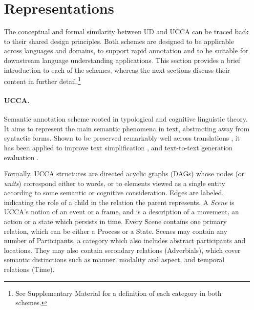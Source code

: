 \documentclass[11pt,a4paper]{article}
\begin{document}

\section{Representations}\label{sec:representations}

  The conceptual and formal similarity between UD and UCCA can be traced back
  to their shared design principles.
  Both schemes are designed to be applicable across languages and domains, 
  to support rapid annotation and to be suitable for downstream language understanding
  applications. This section provides a brief introduction to each of the schemes, whereas
  the next sections discuss their content in further
  detail.\footnote{See Supplementary Material for a definition of each category in both schemes.}
  


\paragraph{UCCA.}\label{sec:ucca}
  Semantic annotation scheme rooted in typological 
  and cognitive linguistic theory.
  It aims to represent the main semantic phenomena in text, abstracting away from syntactic forms.
  Shown to be preserved remarkably well across translations \citep{sulem2015conceptual}, it has been applied to
  improve text simplification \citep{sulem2018simple},
  and text-to-text generation evaluation \citep{birch2016hume,choshen2018usim,sulem2018samsa}.

  Formally, UCCA structures are directed acyclic graphs (DAGs) whose nodes (or {\it units}) correspond either to words,
  or to elements viewed as a single entity according to some semantic or cognitive consideration.
  Edges are labeled, indicating the role of a child in the relation the parent represents.
  A {\it Scene} is UCCA's notion of an event or a frame, and is a description of a movement, an action or a state which persists in time. 
  Every Scene contains one primary relation, which can be either a Process or a State. 
  Scenes may contain any number of Participants, a category which also includes abstract participants and locations.
  They may also contain secondary relations (Adverbials), which cover semantic distinctions such as manner, modality and aspect,
  and temporal relations (Time).
\end{document}
